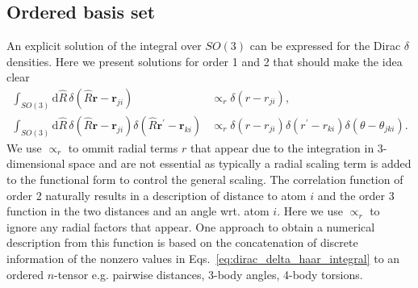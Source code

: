 \subsection{Ordered basis set}
An explicit solution of the integral over $SO(3)$ can be expressed for the Dirac $\delta$ densities.
Here we present solutions for order 1 and 2 that should make the idea clear
\begin{subequations}
\label{eq:dirac_delta_haar_integral}
\begin{align}
    \label{eq:dirac_delta_haar_integral_2body}
    \int_{SO(3)} \mathrm{d}\hat{R}\, \delta(\hat{R}\mathbf{r}-\mathbf{r}_{ji}) &\propto_r \delta(r-r_{ji}), \\%
    \label{eq:dirac_delta_haar_integral_3body}
    \int_{SO(3)} \mathrm{d}\hat{R}\, \delta(\hat{R}\mathbf{r}-\mathbf{r}_{ji}) \delta(\hat{R}\mathbf{r}^\prime-\mathbf{r}_{ki}) &\propto_r \delta(r-r_{ji})\delta(r^\prime-r_{ki})\delta(\theta-\theta_{jki}). %
\end{align}
\end{subequations}
We use $\propto_r$ to ommit radial terms $r$ that appear due to the integration in $3$-dimensional space and are not essential as typically a radial scaling term is added to the functional form to control the general scaling.
The correlation function of order 2 naturally results in a description of distance to atom $i$ and the order 3 function in the two distances and an angle wrt. atom $i$.
Here we use $\propto_r$ to ignore any radial factors that appear.
One approach to obtain a numerical description from this function is based on the concatenation of discrete information of the nonzero values in Eqs.~\ref{eq:dirac_delta_haar_integral} to an ordered $n$-tensor e.g. pairwise distances\cite{rupp2012fast, montavon2012learning, montavon2013machine, sadeghi2013metrics}, 3-body angles, 4-body torsions\cite{huang2016communication}.
